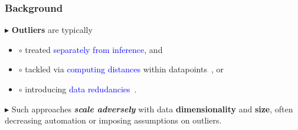 \documentclass[hyperref={colorlinks = true},unknownkeysallowed]{beamer}
\let\oldcitep=\citep
\renewcommand\citep[1]{\hypersetup{linkcolor=darkred}\hyperlink{#1}{\oldcitep{#1}}}
\begin{document}
\begin{frame}
	\frametitle{Background}
	$\blacktriangleright$ \textbf{Outliers} are typically 
	\begin{itemize}
		\item $\circ$ treated \textcolor{blue}{separately from inference}, and
		\item $\circ$ tackled via \textcolor{blue}{computing distances} within datapoints~\citep{diakonikolas19, dickens20}, or
		\item $\circ$ introducing \textcolor{blue}{data redudancies}~\citep{raykar10, karger11}.
	\end{itemize} 
	\pause
	$\blacktriangleright$ Such approaches \emph{\textbf{scale adversely}} with data \textbf{dimensionality} and \textbf{size}, often decreasing automation or imposing assumptions on outliers.
\end{frame}
\end{document}
